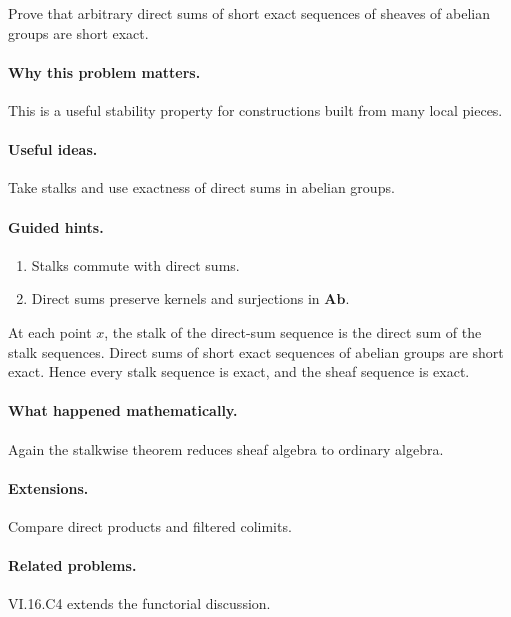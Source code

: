 \begin{problem}\label{prob:vi16-p14}
Prove that arbitrary direct sums of short exact sequences of sheaves of abelian groups are short exact.
\end{problem}

\ifdefined\FullProblemDossiers
\paragraph{Why this problem matters.}
This is a useful stability property for constructions built from many local pieces.

\paragraph{Useful ideas.}
Take stalks and use exactness of direct sums in abelian groups.

\paragraph{Guided hints.}
\begin{enumerate}
\item Stalks commute with direct sums.
\item Direct sums preserve kernels and surjections in $\mathbf{Ab}$.
\end{enumerate}

\begin{solution}
At each point $x$, the stalk of the direct-sum sequence is the direct sum of the stalk sequences.  Direct sums of short exact sequences of abelian groups are short exact.  Hence every stalk sequence is exact, and the sheaf sequence is exact.
\end{solution}

\paragraph{What happened mathematically.}
Again the stalkwise theorem reduces sheaf algebra to ordinary algebra.

\paragraph{Extensions.}
Compare direct products and filtered colimits.

\paragraph{Related problems.}
VI.16.C4 extends the functorial discussion.
\fi
